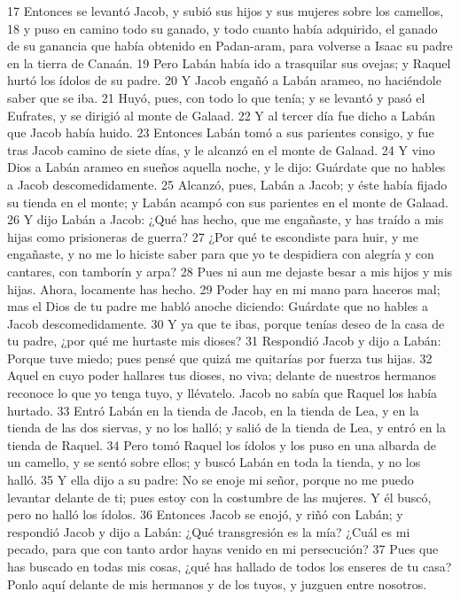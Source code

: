 17 Entonces se levantó Jacob, y subió sus hijos y sus mujeres sobre los camellos,
18 y puso en camino todo su ganado, y todo cuanto había adquirido, el ganado de su ganancia que había obtenido en Padan-aram, para volverse a Isaac su padre en la tierra de Canaán.
19 Pero Labán había ido a trasquilar sus ovejas; y Raquel hurtó los ídolos de su padre.
20 Y Jacob engañó a Labán arameo, no haciéndole saber que se iba.
21 Huyó, pues, con todo lo que tenía; y se levantó y pasó el Eufrates, y se dirigió al monte de Galaad.
22 Y al tercer día fue dicho a Labán que Jacob había huido.
23 Entonces Labán tomó a sus parientes consigo, y fue tras Jacob camino de siete días, y le alcanzó en el monte de Galaad.
24 Y vino Dios a Labán arameo en sueños aquella noche, y le dijo: Guárdate que no hables a Jacob descomedidamente.
25 Alcanzó, pues, Labán a Jacob; y éste había fijado su tienda en el monte; y Labán acampó con sus parientes en el monte de Galaad.
26 Y dijo Labán a Jacob: ¿Qué has hecho, que me engañaste, y has traído a mis hijas como prisioneras de guerra?
27 ¿Por qué te escondiste para huir, y me engañaste, y no me lo hiciste saber para que yo te despidiera con alegría y con cantares, con tamborín y arpa?
28 Pues ni aun me dejaste besar a mis hijos y mis hijas. Ahora, locamente has hecho.
29 Poder hay en mi mano para haceros mal; mas el Dios de tu padre me habló anoche diciendo: Guárdate que no hables a Jacob descomedidamente.
30 Y ya que te ibas, porque tenías deseo de la casa de tu padre, ¿por qué me hurtaste mis dioses?
31 Respondió Jacob y dijo a Labán: Porque tuve miedo; pues pensé que quizá me quitarías por fuerza tus hijas.
32 Aquel en cuyo poder hallares tus dioses, no viva; delante de nuestros hermanos reconoce lo que yo tenga tuyo, y llévatelo. Jacob no sabía que Raquel los había hurtado.
33 Entró Labán en la tienda de Jacob, en la tienda de Lea, y en la tienda de las dos siervas, y no los halló; y salió de la tienda de Lea, y entró en la tienda de Raquel.
34 Pero tomó Raquel los ídolos y los puso en una albarda de un camello, y se sentó sobre ellos; y buscó Labán en toda la tienda, y no los halló.
35 Y ella dijo a su padre: No se enoje mi señor, porque no me puedo levantar delante de ti; pues estoy con la costumbre de las mujeres. Y él buscó, pero no halló los ídolos.
36 Entonces Jacob se enojó, y riñó con Labán; y respondió Jacob y dijo a Labán: ¿Qué transgresión es la mía? ¿Cuál es mi pecado, para que con tanto ardor hayas venido en mi persecución?
37 Pues que has buscado en todas mis cosas, ¿qué has hallado de todos los enseres de tu casa? Ponlo aquí delante de mis hermanos y de los tuyos, y juzguen entre nosotros.
